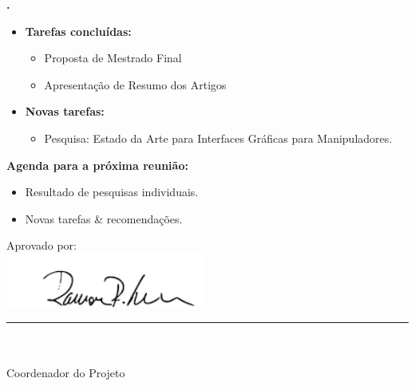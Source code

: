 		
   \textbf{\julia.} 
	\begin{itemize}
		\item \textbf{Tarefas concluídas:}
			\begin{itemize}    
				\item Proposta de Mestrado Final
				\item Apresentação de Resumo dos Artigos
			\end{itemize}
		
		\item \textbf{Novas tarefas:}
			\begin{itemize} 
			 \item Pesquisa: Estado da Arte para Interfaces Gráficas para Manipuladores.
			\end{itemize}
	\end{itemize}


\textbf{Agenda para a próxima reunião:}
  \begin{itemize}
    \item Resultado de pesquisas individuais.
    \item Novas tarefas \& recomendações.
  \end{itemize}


\vspace{5mm}%
\parbox[t]{70mm}{
  Aprovado por: \\[5mm]
  \centering
  \includegraphics[width=65mm]{figs/logo/assinatura-ramon.png} \\[-4mm]
  \rule[2mm]{70mm}{0.1mm} \\
  \ramon \\[1mm]
  Coordenador do Projeto \\
}

\fim